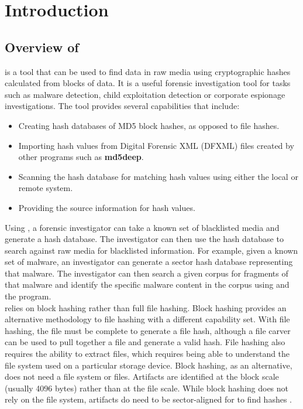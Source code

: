 \documentclass[11pt,fleqn]{article} %
\begin{document}
\newpage


\tableofcontents
\newpage
{}





\newpage

\section{Introduction}
\subsection {Overview of \hash}
\hash is a tool that can be used to find data in raw media using cryptographic hashes calculated from blocks of data. It is a useful forensic investigation tool for tasks such as malware detection, child exploitation detection or corporate espionage investigations. The tool provides several capabilities that include:
\begin{itemize}
\item Creating hash databases of MD5 block hashes, as opposed to file hashes.
\item Importing hash values from Digital Forensic XML (DFXML) files created by other programs such as \textbf{md5deep}.
\item Scanning the hash database for matching hash values using either the local or remote system. 
\item Providing the source information for hash values. 
\end{itemize}

Using \hash, a forensic investigator can take a known set of blacklisted media and generate a hash database. The investigator can then use the hash database to search against raw media for blacklisted information. For example, given a known set of malware, an investigator can generate a sector hash database representing that malware. The investigator can then search a given corpus for fragments of that malware and identify the specific malware content in the corpus using \hash and the \bulk program. \\

\hash relies on block hashing rather than full file hashing. Block hashing provides an alternative methodology to file hashing with a different capability set. With file hashing, the file must be complete to generate a file hash, although a file carver can be used to pull together a file and generate a valid hash.  File hashing also requires the ability to extract files, which requires being able to understand the file system used on a particular storage device. Block hashing, as an alternative, does not need a file system or files. Artifacts are identified at the block scale (usually 4096 bytes) rather than at the file scale. While block hashing does not rely on the file system, artifacts do need to be sector-aligned for \hash to find hashes \cite{hashEncoding}.\\
\end{document}
